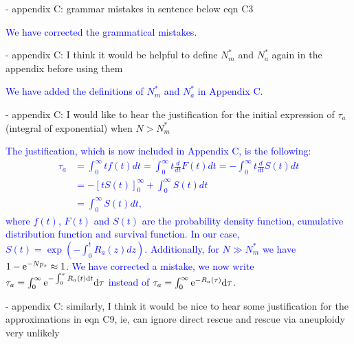 \documentclass[12pt]{extarticle}
\renewcommand{\d}{{\rm d}}
\newcommand{\e}{{\rm e}}
\begin{document}
- appendix C: grammar mistakes in sentence below eqn C3

\textcolor{blue}{We have corrected the grammatical mistakes. } %

- appendix C: I think it would be helpful to define $N_m^*$ and $N_a^*$ again in the appendix before using them

\textcolor{blue}{We have added the definitions of $N_m^*$ and $N_a^*$ in Appendix C. } %

- appendix C: I would like to hear the justification for the initial expression of $\tau_a$ (integral of exponential) when $N>N_m^*$

\textcolor{blue}{%
The justification, which is now included in Appendix C, is the following: 
\begin{align*}
\tau_a&=\int_0^\infty tf(t)dt=\int_0^\infty t\frac{d}{dt}F(t)dt=-\int_0^\infty t\frac{d}{dt}S(t)dt\\
&=-\left[tS(t)\right]_0^\infty+\int_0^\infty S(t)dt\\
&=\int_0^\infty S(t)dt,
\end{align*}
where $f(t)$, $F(t)$ and $S(t)$ are the probability density function, cumulative distribution function and survival function.
In our case, $S(t)=\exp\left(-\int_0^t R_a(z)dz\right)$.
Additionally, for $N\gg N_m^*$ we have $1-\e^{-Np_s}\approx1$. 
We have corrected a mistake, we now write $\tau_a=\int_0^\infty \e^{-\int_0^\tau R_a(t)\d t}\d\tau$
instead of $\tau_a=\int_0^\infty \e^{-R_a(\tau)}\d\tau$.
}

- appendix C: similarly, I think it would be nice to hear some justification for the approximations in eqn C9, ie, can ignore direct rescue and rescue via aneuploidy very unlikely
\end{document}
